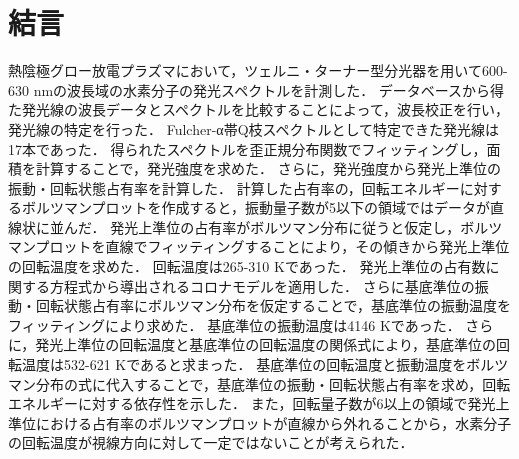 \chapter{結言}

熱陰極グロー放電プラズマにおいて，ツェルニ・ターナー型分光器を用いて600-630 nmの波長域の水素分子の発光スペクトルを計測した．
データベースから得た発光線の波長データとスペクトルを比較することによって，波長校正を行い，発光線の特定を行った．
Fulcher-α帯Q枝スペクトルとして特定できた発光線は17本であった．
得られたスペクトルを歪正規分布関数でフィッティングし，面積を計算することで，発光強度を求めた．
さらに，発光強度から発光上準位の振動・回転状態占有率を計算した．
計算した占有率の，回転エネルギーに対するボルツマンプロットを作成すると，振動量子数が5以下の領域ではデータが直線状に並んだ．
発光上準位の占有率がボルツマン分布に従うと仮定し，ボルツマンプロットを直線でフィッティングすることにより，その傾きから発光上準位の回転温度を求めた．
回転温度は265-310 Kであった．
発光上準位の占有数に関する方程式から導出されるコロナモデルを適用した．
さらに基底準位の振動・回転状態占有率にボルツマン分布を仮定することで，基底準位の振動温度をフィッティングにより求めた．
基底準位の振動温度は4146 Kであった．
さらに，発光上準位の回転温度と基底準位の回転温度の関係式により，基底準位の回転温度は532-621 Kであると求まった．
基底準位の回転温度と振動温度をボルツマン分布の式に代入することで，基底準位の振動・回転状態占有率を求め，回転エネルギーに対する依存性を示した．
また，回転量子数が6以上の領域で発光上準位における占有率のボルツマンプロットが直線から外れることから，水素分子の回転温度が視線方向に対して一定ではないことが考えられた．